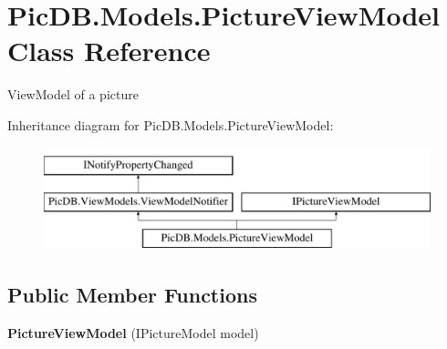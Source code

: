 \hypertarget{class_pic_d_b_1_1_models_1_1_picture_view_model}{}\section{Pic\+D\+B.\+Models.\+Picture\+View\+Model Class Reference}
\label{class_pic_d_b_1_1_models_1_1_picture_view_model}


View\+Model of a picture  


Inheritance diagram for Pic\+D\+B.\+Models.\+Picture\+View\+Model\+:\begin{figure}[H]
\begin{center}
\leavevmode
\includegraphics[height=3.000000cm]{class_pic_d_b_1_1_models_1_1_picture_view_model}
\end{center}
\end{figure}
\subsection*{Public Member Functions}
\begin{DoxyCompactItemize}
\item 
\mbox{\label{class_pic_d_b_1_1_models_1_1_picture_view_model_ace6e3ee641c2a0e9e44684c5d6da9484}} 
{\bfseries Picture\+View\+Model} (I\+Picture\+Model model)
\end{DoxyCompactItemize}
